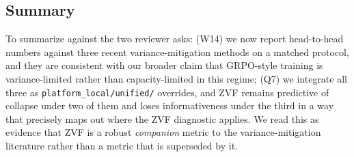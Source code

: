 \subsection{Summary}
\label{sec:variance-summary}

To summarize against the two reviewer asks: (W14) we now report
head-to-head numbers against three recent variance-mitigation methods
on a matched protocol, and they are consistent with our broader
claim that GRPO-style training is variance-limited rather than
capacity-limited in this regime; (Q7) we integrate all three as
\texttt{platform_local/unified/} overrides, and ZVF remains predictive of collapse
under two of them and loses informativeness under the third in a
way that precisely maps out where the ZVF diagnostic applies. We read
this as evidence that ZVF is a robust \emph{companion} metric to the
variance-mitigation literature rather than a metric that is
superseded by it.
